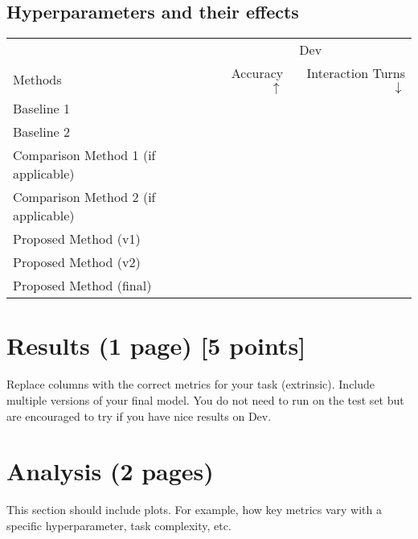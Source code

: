 \documentclass[11pt,a4paper]{article}
\begin{document}
\subsection{Hyperparameters and their effects}

\clearpage
\begin{table}[t]
\centering
\begin{tabular}{@{}lrr@{}}
\toprule
                            & \multicolumn{2}{c}{Dev} \\
Methods                     & Accuracy $\uparrow$ & Interaction Turns $\downarrow$ \\
\midrule
Baseline 1 \cite{} & & \\
Baseline 2 \cite{} & & \\
\midrule
Comparison Method 1 (if applicable) \cite{} & & \\
Comparison Method 2 (if applicable) \cite{} & & \\
\midrule
Proposed Method (v1)            & & \\
Proposed Method (v2)            & & \\
Proposed Method (final)            & & \\
\bottomrule
\end{tabular}
\end{table}
\section{Results (1 page) [5 points]}
Replace columns with the correct metrics for your task (extrinsic). Include multiple versions of your final model.  You do not need to run on the test set but are encouraged to try if you have nice results on Dev.

\clearpage
\section{Analysis (2 pages)}
This section should include plots.  For example, how key metrics vary with a specific hyperparameter, task complexity, etc.
\end{document}
